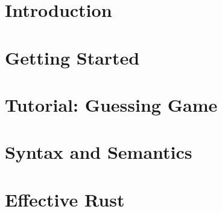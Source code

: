 \documentclass[fontsize=11pt,oneside,a5paper]{scrbook}
\begin{document}
    \newcommand{\x}{\code{x}}
    \newcommand{\y}{\code{y}}
    \newcommand{\z}{\code{z}}
    \newcommand{\struct}{\code{struct}}
    \newcommand{\mut}{\code{mut}}
    \newcommand{\varchar}{\code{char}}
    \newcommand{\println}{\code{println!}}
    \newcommand{\panic}{\code{panic!}}
    \newcommand{\keylet}{\code{let}}
    \newcommand{\enum}{\code{enum}}
    \newcommand{\String}{\code{String}}
    \newcommand{\match}{\code{match}}
    \newcommand{\keyref}{\code{ref}}
    \newcommand{\itt}{\code{i32}}
    \newcommand{\keyif}{\code{if}}
    \newcommand{\result}{\code{Result}}
    \newcommand{\option}{\code{Option}}
    \newcommand{\none}{\code{None}}
    
    \clearscrheadfoot
    \ohead{\rightmark}
    \pagestyle{scrheadings}
    
    
    \pagebreak
    
    \tableofcontents
    \pagebreak

    \blankpage
    \chapter{Introduction}
    \label{sec:intro}
    
    
    \blankpage
    \chapter{Getting Started}
    \label{sec:gettingstarted}
    
    
    \blankpage
    \chapter{Tutorial: Guessing Game}
    \label{sec:tutorial}
    
    
    \blankpage
    \chapter{Syntax and Semantics}
    \label{sec:syntax}
    
    
    \blankpage
    \chapter{Effective Rust}
    \label{sec:effective_rust}
    
    
\end{document}
